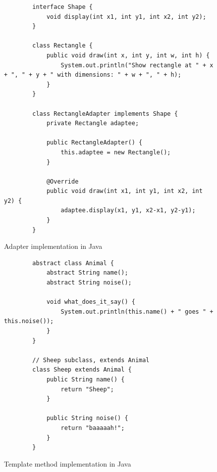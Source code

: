 \documentclass[conference]{IEEEtran}
\begin{document}
\begin{figure}[btp]
    \begin{verbatim}
        interface Shape {
            void display(int x1, int y1, int x2, int y2);
        }

        class Rectangle {
            public void draw(int x, int y, int w, int h) {
                System.out.println("Show rectangle at " + x + ", " + y + " with dimensions: " + w + ", " + h); 
            }
        }

        class RectangleAdapter implements Shape {
            private Rectangle adaptee;

            public RectangleAdapter() {
                this.adaptee = new Rectangle();
            }

            @Override
            public void draw(int x1, int y1, int x2, int y2) {
                adaptee.display(x1, y1, x2-x1, y2-y1);
            }
        }
    \end{verbatim}
    \caption{Adapter implementation in Java}
    \label{fig:adapter-java-impl}
\end{figure}

\begin{figure}[btp]
    \begin{verbatim}
        abstract class Animal {
            abstract String name();
            abstract String noise();

            void what_does_it_say() {
                System.out.println(this.name() + " goes " + this.noise());
            }
        }

        // Sheep subclass, extends Animal 
        class Sheep extends Animal {
            public String name() {
                return "Sheep";
            }

            public String noise() {
                return "baaaaah!";
            }
        }
    \end{verbatim}
    \caption{Template method implementation in Java}
    \label{fig:template-java-impl}
\end{figure}
\end{document}
